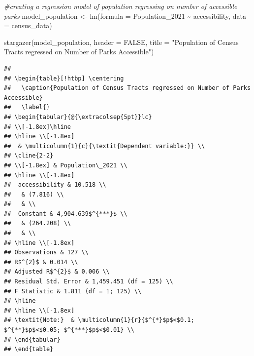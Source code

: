 \documentclass[
]{article}
\newenvironment{Shaded}{\begin{snugshade}}{\end{snugshade}}
\newcommand{\AttributeTok}[1]{\textcolor[rgb]{0.77,0.63,0.00}{#1}}
\newcommand{\CommentTok}[1]{\textcolor[rgb]{0.56,0.35,0.01}{\textit{#1}}}
\newcommand{\ConstantTok}[1]{\textcolor[rgb]{0.00,0.00,0.00}{#1}}
\newcommand{\FunctionTok}[1]{\textcolor[rgb]{0.00,0.00,0.00}{#1}}
\newcommand{\NormalTok}[1]{#1}
\newcommand{\OtherTok}[1]{\textcolor[rgb]{0.56,0.35,0.01}{#1}}
\newcommand{\SpecialCharTok}[1]{\textcolor[rgb]{0.00,0.00,0.00}{#1}}
\newcommand{\StringTok}[1]{\textcolor[rgb]{0.31,0.60,0.02}{#1}}
\begin{document}
\begin{Shaded}
\begin{Highlighting}[]
\CommentTok{\#creating a regression model of population regressing on number of accessible parks}
\NormalTok{model\_population }\OtherTok{\textless{}{-}} \FunctionTok{lm}\NormalTok{(}\AttributeTok{formula =}\NormalTok{ Population\_2021 }\SpecialCharTok{\textasciitilde{}}\NormalTok{ accessibility, }
             \AttributeTok{data =}\NormalTok{ census\_data)}

\FunctionTok{stargazer}\NormalTok{(model\_population,}
          \AttributeTok{header =} \ConstantTok{FALSE}\NormalTok{,}
          \AttributeTok{title =} \StringTok{"Population of Census Tracts regressed on Number of Parks Accessible"}\NormalTok{)}
\end{Highlighting}
\end{Shaded}

\begin{verbatim}
## 
## \begin{table}[!htbp] \centering 
##   \caption{Population of Census Tracts regressed on Number of Parks Accessible} 
##   \label{} 
## \begin{tabular}{@{\extracolsep{5pt}}lc} 
## \\[-1.8ex]\hline 
## \hline \\[-1.8ex] 
##  & \multicolumn{1}{c}{\textit{Dependent variable:}} \\ 
## \cline{2-2} 
## \\[-1.8ex] & Population\_2021 \\ 
## \hline \\[-1.8ex] 
##  accessibility & 10.518 \\ 
##   & (7.816) \\ 
##   & \\ 
##  Constant & 4,904.639$^{***}$ \\ 
##   & (264.208) \\ 
##   & \\ 
## \hline \\[-1.8ex] 
## Observations & 127 \\ 
## R$^{2}$ & 0.014 \\ 
## Adjusted R$^{2}$ & 0.006 \\ 
## Residual Std. Error & 1,459.451 (df = 125) \\ 
## F Statistic & 1.811 (df = 1; 125) \\ 
## \hline 
## \hline \\[-1.8ex] 
## \textit{Note:}  & \multicolumn{1}{r}{$^{*}$p$<$0.1; $^{**}$p$<$0.05; $^{***}$p$<$0.01} \\ 
## \end{tabular} 
## \end{table}
\end{verbatim}
\end{document}
